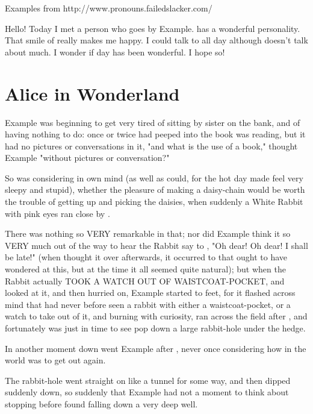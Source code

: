 \documentclass{article}
\begin{document}
Examples from http://www.pronouns.failedslacker.com/

\set
Hello! Today I met a person who goes by  Example. \They has a wonderful personality. That smile of \theirs really makes me happy. I could talk to \them all day although \they doesn't talk about \themself much. I wonder if \their day has been wonderful. I hope so!

\section{Alice in Wonderland}

\set
 Example  was beginning to get very tired of sitting by \their[1] sister on the bank, and of having nothing to do: once or twice \they[1] had peeped into the book \they[2] was reading, but it had no pictures or conversations in it, "and what is the use of a book," thought  Example  "without pictures or conversation?"

\set
So \they was considering in \their own mind (as well as \they could, for the hot day made \them feel very sleepy and stupid), whether the pleasure of making a daisy-chain would be worth the trouble of getting up and picking the daisies, when suddenly a White Rabbit with pink eyes ran close by \them.

\set
There was nothing so VERY remarkable in that; nor did  Example  think it so VERY much out of the way to hear the Rabbit say to \themself[2], "Oh dear! Oh dear! I shall be late!" (when \they thought it over afterwards, it occurred to \them that \they ought to have wondered at this, but at the time it all seemed quite natural); but when the Rabbit actually TOOK A WATCH OUT OF \their[2] WAISTCOAT-POCKET, and looked at it, and then hurried on,  Example  started to \their feet, for it flashed across \their mind that \they had never before seen a rabbit with either a waistcoat-pocket, or a watch to take out of it, and burning with curiosity, \they ran across the field after \them[2], and fortunately was just in time to see \them[2] pop down a large rabbit-hole under the hedge.

\set
In another moment down went  Example  after \them[2], never once considering how in the world \they was to get out again.

\set
The rabbit-hole went straight on like a tunnel for some way, and then dipped suddenly down, so suddenly that  Example  had not a moment to think about stopping \themself before \they found \themself falling down a very deep well.
\end{document}
